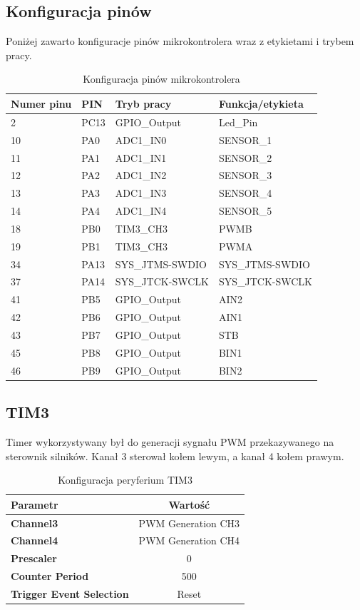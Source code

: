\documentclass[10pt, a4paper]{article}
\begin{document}
\subsection{Konfiguracja pinów}
\noindent Poniżej zawarto konfiguracje pinów mikrokontrolera wraz z etykietami i trybem pracy.
\begin{table}[H]
	\centering
	\begin{tabular}{|l|l|l|l|}
		\hline
		Numer pinu	&	PIN & Tryb pracy & Funkcja/etykieta\\
		\hline
		2&	PC13 & GPIO\_Output &	Led\_Pin	\\
		10&	PA0 & ADC1\_IN0 &	SENSOR\_1	\\
		11&	PA1 & ADC1\_IN1 &	SENSOR\_2	\\
		12&	PA2 & ADC1\_IN2 &	SENSOR\_3\\
		13&	PA3 &	ADC1\_IN3&	SENSOR\_4 \\
		14&	PA4 &	ADC1\_IN4&	SENSOR\_5\\
		18&	PB0 &	TIM3\_CH3&	PWMB\\
		19&	PB1 &	TIM3\_CH3&	PWMA\\
		34&	PA13 &	SYS\_JTMS-SWDIO&	SYS\_JTMS-SWDIO\\
		37&	PA14 &	SYS\_JTCK-SWCLK&	SYS\_JTCK-SWCLK\\
		41&	PB5 &	GPIO\_Output&	AIN2\\
		42&	PB6 &	GPIO\_Output&	AIN1\\
		43&	PB7 &	GPIO\_Output&	STB\\
		45&	PB8 &	GPIO\_Output&	BIN1\\
		46&	PB9 &	GPIO\_Output&	BIN2\\
		\hline
	\end{tabular}
	\caption{Konfiguracja pinów mikrokontrolera}
	\label{tab:KonfiguracjaPinów}	
\end{table}

\subsection{TIM3}
\noindent Timer wykorzystywany był do generacji sygnału PWM przekazywanego na sterownik silników. Kanał 3 sterował kołem lewym, a kanał 4 kołem prawym.
\begin{table}[H]
	\centering
	\begin{tabular}{|l|c|} \hline
		\textbf{Parametr} & Wartość \\
		\hline
		\hline  \textbf{Channel3}& PWM Generation CH3\\\hline
		\textbf{Channel4} & PWM Generation CH4\\
		\hline
		\textbf{Prescaler} & 0\\
		\hline	
		\textbf{Counter Period} & 500\\
		\hline	
		\textbf{Trigger Event Selection} & Reset\\
		\hline
	\end{tabular}
	\caption{Konfiguracja peryferium TIM3}
	\label{tab:TIM3}
\end{table}
\end{document}
